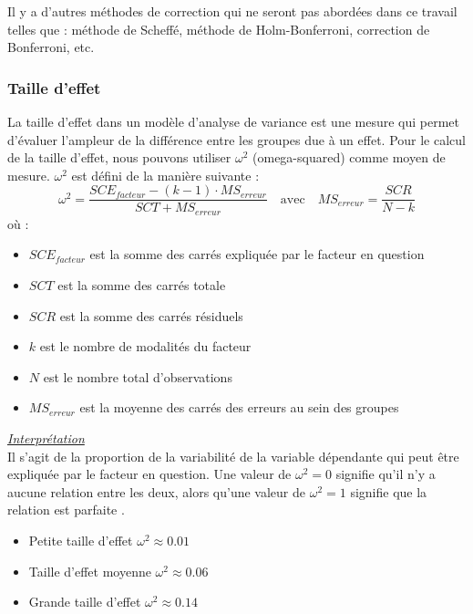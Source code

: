 \documentclass[12pt,a4paper]{article}
\begin{document}
	Il y a d'autres méthodes de correction qui ne seront pas abordées dans ce travail telles que : méthode de Scheffé, méthode de Holm-Bonferroni, correction de Bonferroni, etc.
	
	\subsubsection{Taille d'effet}
	\begin{mdframed}[backgroundcolor=gray!20, hidealllines=true, innermargin=10pt, outermargin=10pt, skipabove=10pt, skipbelow=10pt, nobreak=true]
		La taille d'effet dans un modèle d'analyse de variance est une mesure qui permet d'évaluer l'ampleur de la différence entre les groupes due à un effet.
		Pour le calcul de la taille d'effet, nous pouvons utiliser $\omega^2$ (omega-squared) comme moyen de mesure.
		$\omega^2$ est défini de la manière suivante \cite{wikipediaEffectSize} : 
		\begin{equation}
			\omega^2 = \frac{SCE_{facteur} - (k-1)\cdot MS_{erreur}}{SCT + MS_{erreur}} \quad \text{avec} \quad MS_{erreur} = \frac{SCR}{N-k}
		\end{equation}    
		où : 
		\begin{itemize}[label=--, leftmargin=*]
			\item $SCE_{facteur}$ est la somme des carrés expliquée par le facteur en question
			\item $SCT$ est la somme des carrés totale
			\item $SCR$ est la somme des carrés résiduels
			\item $k$ est le nombre de modalités du facteur
			\item $N$ est le nombre total d'observations
			\item $MS_{erreur}$ est la moyenne des carrés des erreurs au sein des groupes 
		\end{itemize}
	\end{mdframed}
	
	\noindent
	\textit{\underline{Interprétation}}  \\
	
	Il s'agit de la proportion de la variabilité de la variable dépendante qui peut être expliquée par le facteur en question. Une valeur de $\omega^2 = 0$ signifie qu'il n'y a aucune relation entre les deux, alors qu'une valeur de $\omega^2 = 1$ signifie que la relation est parfaite \cite{navarro2021}. 
	\begin{itemize}[label=--, leftmargin=*]
		\item Petite taille d'effet $\omega^2 \approx 0.01$
		\item Taille d'effet moyenne $\omega^2 \approx 0.06$
		\item Grande taille d'effet $\omega^2 \approx 0.14$
	\end{itemize}    
	
\end{document}
